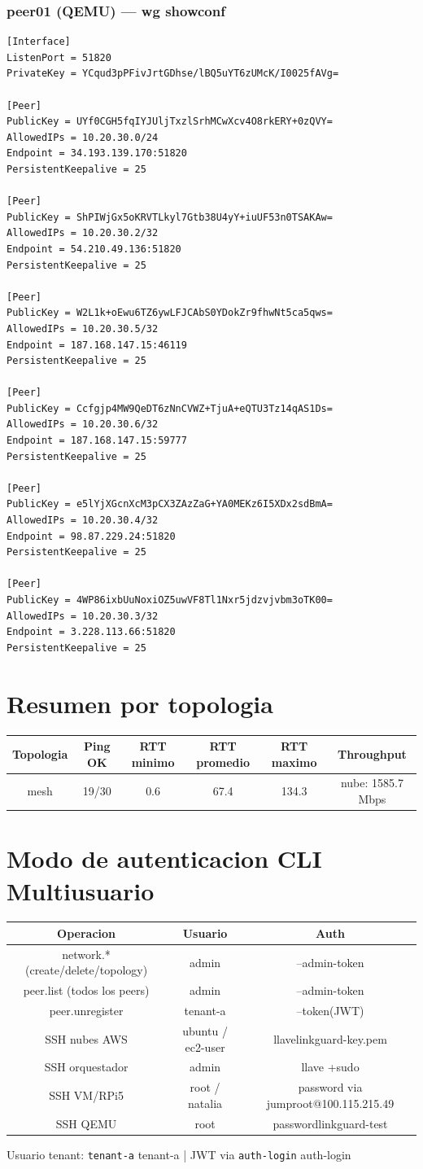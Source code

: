 \documentclass[11pt,a4paper]{article}
\begin{document}
\subsubsection*{peer01 (QEMU) — wg showconf}
\begin{lstlisting}
[Interface]
ListenPort = 51820
PrivateKey = YCqud3pPFivJrtGDhse/lBQ5uYT6zUMcK/I0025fAVg=

[Peer]
PublicKey = UYf0CGH5fqIYJUljTxzlSrhMCwXcv4O8rkERY+0zQVY=
AllowedIPs = 10.20.30.0/24
Endpoint = 34.193.139.170:51820
PersistentKeepalive = 25

[Peer]
PublicKey = ShPIWjGx5oKRVTLkyl7Gtb38U4yY+iuUF53n0TSAKAw=
AllowedIPs = 10.20.30.2/32
Endpoint = 54.210.49.136:51820
PersistentKeepalive = 25

[Peer]
PublicKey = W2L1k+oEwu6TZ6ywLFJCAbS0YDokZr9fhwNt5ca5qws=
AllowedIPs = 10.20.30.5/32
Endpoint = 187.168.147.15:46119
PersistentKeepalive = 25

[Peer]
PublicKey = Ccfgjp4MW9QeDT6zNnCVWZ+TjuA+eQTU3Tz14qAS1Ds=
AllowedIPs = 10.20.30.6/32
Endpoint = 187.168.147.15:59777
PersistentKeepalive = 25

[Peer]
PublicKey = e5lYjXGcnXcM3pCX3ZAzZaG+YA0MEKz6I5XDx2sdBmA=
AllowedIPs = 10.20.30.4/32
Endpoint = 98.87.229.24:51820
PersistentKeepalive = 25

[Peer]
PublicKey = 4WP86ixbUuNoxiOZ5uwVF8Tl1Nxr5jdzvjvbm3oTK00=
AllowedIPs = 10.20.30.3/32
Endpoint = 3.228.113.66:51820
PersistentKeepalive = 25

\end{lstlisting}

\section{Resumen por topologia}
\begin{longtable}{|c|c|c|c|c|c|}
\hline
Topologia & Ping OK & RTT minimo & RTT promedio & RTT maximo & Throughput \\ \hline
mesh & 19/30 & 0.6 & 67.4 & 134.3 & nube: 1585.7 Mbps \\ \hline
\end{longtable}

\section{Modo de autenticacion CLI Multiusuario}
\begin{longtable}{|c|c|c|}
\hline
Operacion & Usuario & Auth \\ \hline
network.* (create/delete/topology) & admin & --admin-token \\ \hline
peer.list (todos los peers) & admin & --admin-token \\ \hline
peer.unregister & tenant-a & --token(JWT) \\ \hline
SSH nubes AWS & ubuntu / ec2-user & llavelinkguard-key.pem \\ \hline
SSH orquestador & admin & llave +sudo \\ \hline
SSH VM/RPi5 & root / natalia & password via jumproot@100.115.215.49 \\ \hline
SSH QEMU & root & passwordlinkguard-test \\ \hline
\end{longtable}

Usuario tenant:  \texttt{tenant-a} tenant-a  | JWT via  \texttt{auth-login} auth-login\\
\end{document}
